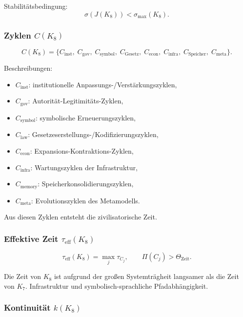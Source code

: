 Stabilitätsbedingung:
\[
\sigma(J(K_8)) < \sigma_{\max}(K_8).
\]

\subsubsection{Zyklen \texorpdfstring{$C(K_8)$}{C(K_8)}}

\[
C(K_8)=
\{
C_{\mathrm{inst}},\;
C_{\mathrm{gov}},\;
C_{\mathrm{symbol}},\;
C_{\mathrm{Gesetz}},\;
C_{\mathrm{econ}},\;
C_{\mathrm{infra}},\;
C_{\mathrm{Speicher}},\;
C_{\mathrm{meta}}
\}.
\]

Beschreibungen:
\begin{itemize}
    \item $C_{\mathrm{inst}}$: institutionelle Anpassungs-/Verstärkungszyklen,
    \item $C_{\mathrm{gov}}$: Autorität-Legitimitäts-Zyklen,
    \item $C_{\mathrm{symbol}}$: symbolische Erneuerungszyklen,
    \item $C_{\mathrm{law}}$: Gesetzeserstellungs-/Kodifizierungszyklen,
    \item $C_{\mathrm{econ}}$: Expansions-Kontraktions-Zyklen,
    \item $C_{\mathrm{infra}}$: Wartungszyklen der Infrastruktur,
    \item $C_{\mathrm{memory}}$: Speicherkonsolidierungszyklen,
    \item $C_{\mathrm{meta}}$: Evolutionszyklen des Metamodells.
\end{itemize}

Aus diesen Zyklen entsteht die zivilisatorische Zeit.

\subsubsection{Effektive Zeit \texorpdfstring{$\tau_{\mathrm{eff}}(K_8)$}{tau_eff(K8)}}

\[
\tau_{\mathrm{eff}}(K_8)=\max_j \tau_{C_j},
\qquad
\Pi(C_j) > \Theta_{\mathrm{Zeit}}.
\]

Die Zeit von $K_8$ ist aufgrund der großen Systemträgheit langsamer als die Zeit von $K_7$.
Infrastruktur und symbolisch-sprachliche Pfadabhängigkeit.

\subsubsection{Kontinuität \texorpdfstring{$k(K_8)$}{k(K_8)}}

